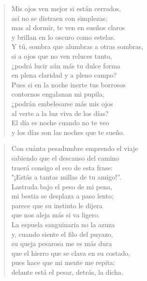 \documentclass[12pt]{article}
\begin{document}
\clearpage
{}
\begin{verse}

Mis ojos ven mejor si están cerrados,\\
así no se distraen con simplezas;\\
mas al dormir, te ven en sueños claros\\
y brillan en lo oscuro como estelas.\\
Y tú, sombra que alumbras a otras sombras,\\
si a ojos que no ven reluces tanto,\\
¿podrá lucir aún más tu dulce forma\\
en plena claridad y a pleno campo?\\
Pues si en la noche inerte tus borrosos\\
contornos engalanan mi pupila,\\
¿podrán embelesarse más mis ojos\\
al verte a la luz viva de los días?\\
El día es noche cuando no te veo\\
y los días son las noches que te sueño.

\end{verse}

\clearpage
{}
\begin{verse}

Con cuánta pesadumbre emprendo el viaje\\
sabiendo que el descanso del camino\\
traerá consigo el eco de esta frase:\\
"¡Estás a tantas millas de tu amigo!''.\\
Lastrada bajo el peso de mi pena,\\
mi bestia se desplaza a paso lento;\\
parece que su instinto le dijera\\
que nos aleja más si va ligero.\\
La espuela sanguinaria no la azuza\\
y, cuando siente el filo del puyazo,\\
su queja pesarosa me es más dura\\
que el hierro que se clava en su costado,\\
pues hace que mi mente me repita:\\
delante está el pesar, detrás, la dicha.

\end{verse}
\end{document}
